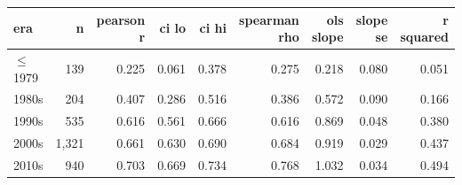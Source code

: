 \begin{tabular}{lrrrrrrrr}
\toprule
era & n & pearson r & ci lo & ci hi & spearman rho & ols slope & slope se & r squared \\
\midrule
$\leq$1979 & 139 & 0.225 & 0.061 & 0.378 & 0.275 & 0.218 & 0.080 & 0.051 \\
1980s & 204 & 0.407 & 0.286 & 0.516 & 0.386 & 0.572 & 0.090 & 0.166 \\
1990s & 535 & 0.616 & 0.561 & 0.666 & 0.616 & 0.869 & 0.048 & 0.380 \\
2000s & 1,321 & 0.661 & 0.630 & 0.690 & 0.684 & 0.919 & 0.029 & 0.437 \\
2010s & 940 & 0.703 & 0.669 & 0.734 & 0.768 & 1.032 & 0.034 & 0.494 \\
\bottomrule
\end{tabular}